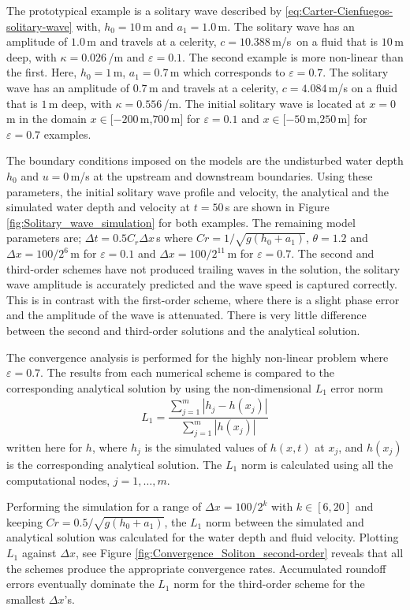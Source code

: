 \documentclass[preprint,sort&compress,1p]{article}
\begin{document}
The prototypical example is a solitary wave described by \eqref{eq:Carter-Cienfuegos-solitary-wave} with, $h_0 = 10$\,m and $a_1 = 1.0$\,m. The solitary wave has an amplitude of $1.0$\,m and travels at a celerity, $c = 10.388$\,m/s~on a fluid that is $10$\,m deep, with $\kappa = 0.026$\,/m  and $\varepsilon = 0.1$. The second example is more non-linear than the first. Here, $h_0 = 1$\,m, $a_1 = 0.7$\,m which corresponds to $\varepsilon = 0.7$. The solitary wave has an amplitude of $0.7$\,m and travels at a celerity, $c = 4.084$\,m/s on a fluid that is $1$\,m deep, with $\kappa = 0.556$\,/m. The initial solitary wave is located at $x = 0$\,m in the domain $x \in [-200$\,m,$700$\,m$]$ for $\varepsilon = 0.1$ and $x \in [-50$\,m,$250$\,m$]$ for $\varepsilon = 0.7$ examples.

The boundary conditions imposed on the models are the undisturbed water depth $h_0$ and $u = 0$\,m/s at the upstream and downstream boundaries. Using these parameters, the initial solitary wave profile and velocity, the analytical and the simulated water depth and velocity at $t = 50$\,s are shown in Figure \ref{fig:Solitary_wave_simulation} for both examples. The remaining model parameters are; $\Delta t = 0.5 C_r\Delta x$\,s where $Cr = 1/\sqrt{g(h_0 + a_1)}$, $\theta = 1.2$ and $\Delta x = 100/2^6$\,m for $\varepsilon = 0.1$ and $\Delta x = 100/2^{11}$\,m for $\varepsilon = 0.7$.  The second and third-order schemes have not produced trailing waves in the solution, the solitary wave amplitude is accurately predicted and the wave speed is captured correctly. This is in contrast with the first-order scheme, where there is a slight phase error and the amplitude of the wave is attenuated. There is very little difference between the second and third-order solutions and the analytical solution.

The convergence analysis is performed for the highly non-linear problem where $\varepsilon = 0.7$. The results from each numerical scheme is compared to the corresponding analytical solution by using the non-dimensional $L_1$ error norm
\begin{gather}
L_1 = \dfrac{\sum_{j=1}^m |h_j - h(x_j)|}{\sum_{j=1}^m |h(x_j)|}
\label{eq:L1_norm}
\end{gather}
written here for $h$, where $h_j$ is the simulated values of $h(x,t)$ at $x_j$, and $h(x_j)$ is the corresponding analytical solution. The $L_1$ norm is calculated using all the computational nodes, $j = 1,\ldots, m$.

Performing the simulation for a range of $\Delta x =100/2^k$ with $k \in [6,20]$ and keeping $Cr = 0.5/\sqrt{g(h_0 + a_1)}$, the $L_1$ norm between the simulated and analytical solution was calculated for the water depth and fluid velocity. Plotting $L_1$ against $\Delta x$, see Figure \ref{fig:Convergence_Soliton_second-order} reveals that all the schemes produce the appropriate convergence rates. Accumulated roundoff errors eventually dominate the $L_1$ norm for the third-order scheme for the smallest $\Delta x$'s.
\end{document}
